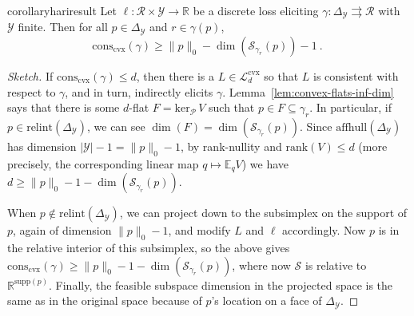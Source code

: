 \documentclass[11pt]{article} %
\newcommand{\Comments}{1}
\newcommand{\mynote}[2]{\ifnum\Comments=1\textcolor{#1}{#2}\fi}
\newcommand{\jessie}[1]{\mynote{purple}{[JF: #1]}}
\newcommand{\reals}{\mathbb{R}}
\newcommand{\simplex}{\Delta_\Y}
\newcommand{\relint}[1]{\mathrm{relint}(#1)}
\newcommand{\conscvx}{\mathrm{cons}_\mathrm{cvx}}
\newcommand{\rank}{\mathrm{rank}}
\newcommand{\supp}{\mathrm{supp}}
\newcommand{\zeros}[1]{\mathrm{ker}_\P\,#1}
\newcommand{\codim}{\mathrm{codim}}
\newcommand{\Pcodim}{\mathcal{P}\!\text{-}\mathrm{codim}}
\newcommand{\affhull}{\mathrm{affhull}}
\newcommand{\E}{\mathbb{E}}
\newcommand{\Lcvx}{\mathcal{L}^{\mathrm{cvx}}}
\newcommand{\R}{\mathcal{R}}
\renewcommand{\P}{\mathcal{P}}
\newcommand{\Sc}{\mathcal{S}}  %
\newcommand{\Y}{\mathcal{Y}}
\newcommand{\toto}{\rightrightarrows}
\newtheorem{lemma}{Lemma}
\begin{document}
%	

\begin{restatable}{corollary}{hariresult}\label{cor:fsd-bound}
	Let $\ell:\R \times \Y \to \reals$ be a discrete loss eliciting $\gamma:\simplex \toto \R$ with $\Y$ finite.
	Then for all $p \in \simplex$ and $r \in \gamma(p)$,
	\begin{equation}
	\conscvx(\gamma) \geq \|p\|_0 - \dim(\Sc_{\gamma_r}(p)) - 1~.~
	\end{equation}
\end{restatable}
\begin{proof}[Sketch]
	If $\conscvx(\gamma) \leq d$, then there is a $L \in \Lcvx_d$ so that $L$ is consistent with respect to $\gamma$, and in turn, indirectly elicits $\gamma$.
	Lemma~\ref{lem:convex-flats-inf-dim} says that there is some $d$-flat $F = \zeros{V}$ such that $p \in F \subseteq \gamma_r$.
	In particular, if $p \in \relint{\simplex}$, we can see $\dim(F) = \dim(\Sc_{\gamma_r}(p))$.
	Since $\affhull(\simplex)$ has dimension $|\Y| - 1 = \|p\|_0 - 1$, by rank-nullity and $\rank(V) \leq d$ (more precisely, the corresponding linear map $q\mapsto \E_q V$) we have $d \geq \|p\|_0-1-\dim(\Sc_{\gamma_r}(p))$.
	
	When $p \not \in \relint{\simplex}$, we can project down to the subsimplex on the support of $p$, again of dimension $\|p\|_0 - 1$, and modify $L$ and $\ell$ accordingly.
	Now $p$ is in the relative interior of this subsimplex, so the above gives $\conscvx(\gamma) \geq \|p\|_0 - 1 - \dim(\Sc_{\gamma_r}(p))$, where now $\Sc$ is relative to $\reals^{\supp(p)}$.
	Finally, the feasible subspace dimension in the projected space is the same as in the original space because of $p$'s location on a face of $\simplex$.
\end{proof}
\end{document}
